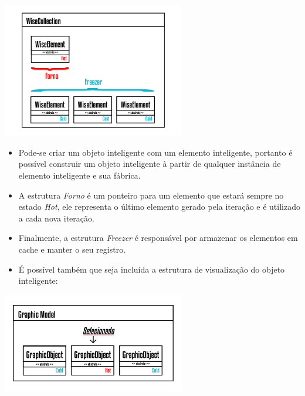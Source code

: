 \documentclass[10pt]{beamer}
\theoremstyle{remark}
\theoremstyle{definition}
\begin{document}
\begin{frame}[allowframebreaks]
\begin{center}
			\item \includegraphics[width=0.6\textwidth]{images/WiseCollection.png}
			
		\end{center}
		\framebreak
		
		\begin{itemize}
			\item Pode-se criar um objeto inteligente com um elemento inteligente, portanto é possível construir um objeto inteligente à partir de qualquer instância de elemento inteligente e sua fábrica.
			\item A estrutura \textit{Forno} é um ponteiro para um elemento que estará sempre no estado \textit{Hot}, ele representa o último elemento gerado pela iteração e é utilizado a cada nova iteração.
			\item Finalmente, a estrutura \textit{Freezer} é responsável por armazenar os elementos em cache e manter o seu registro.
		\end{itemize}
		
		\framebreak
		
		\begin{itemize}
				\item É possível também que seja incluída a estrutura de visualização do objeto inteligente:
		\end{itemize}		
		
		\begin{center}
			
			\item \includegraphics[width=0.6\textwidth]{images/GraphicModel.png}
			

\end{center}
\end{frame}
\end{document}
